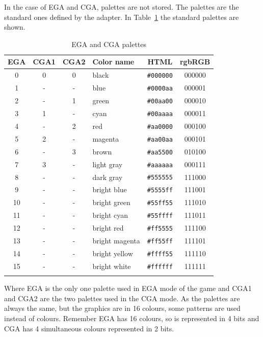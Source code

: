 \documentclass{article}
\begin{document}
\pagebreak[2]
 In the case of EGA and CGA, palettes are not stored. The palettes are the standard ones
 defined by the adapter. In Table~\ref{egacga pals} the standard palettes are shown. 
 
\renewcommand{\tabcolsep}{0.5em}
\begin{longtable}{ccclcc}
 \hline
  EGA & CGA1 & CGA2  & Color name      &  HTML     & rgbRGB \\
 \hline
  0   & 0    & 0     & black           & \verb!#000000!  & 000000 \\
  1   & -    & -     & blue            & \verb!#0000aa!  & 000001 \\
  2   & -    & 1     & green           & \verb!#00aa00!  & 000010 \\
  3   & 1    & -     & cyan            & \verb!#00aaaa!  & 000011 \\
  4   & -    & 2     & red             & \verb!#aa0000!  & 000100 \\
  5   & 2    & -     & magenta         & \verb!#aa00aa!  & 000101 \\
  6   & -    & 3     & brown           & \verb!#aa5500!  & 010100 \\
  7   & 3    & -     & light gray      & \verb!#aaaaaa!  & 000111 \\
  8   & -    & -     & dark gray       & \verb!#555555!  & 111000 \\
  9   & -    & -     & bright blue     & \verb!#5555ff!  & 111001 \\
  10  & -    & -     & bright green    & \verb!#55ff55!  & 111010 \\
  11  & -    & -     & bright cyan     & \verb!#55ffff!  & 111011 \\
  12  & -    & -     & bright red      & \verb!#ff5555!  & 111100 \\
  13  & -    & -     & bright magenta  & \verb!#ff55ff!  & 111101 \\
  14  & -    & -     & bright yellow   & \verb!#ffff55!  & 111110 \\
  15  & -    & -     & bright white    & \verb!#ffffff!  & 111111 \\
 \hline
 \caption{EGA and CGA palettes}
 \label{egacga pals}
\end{longtable}

 Where  EGA is the only one palette used in EGA mode of the game and CGA1
 and CGA2 are the two palettes used in the  CGA mode.
 As the palettes are always the same, but the graphics are in 16 colours,
 some patterns are used instead of colours.
 Remember EGA has 16 colours, so is represented in 4 bits and CGA has 4
 simultaneous colours represented in 2 bits.
\end{document}
